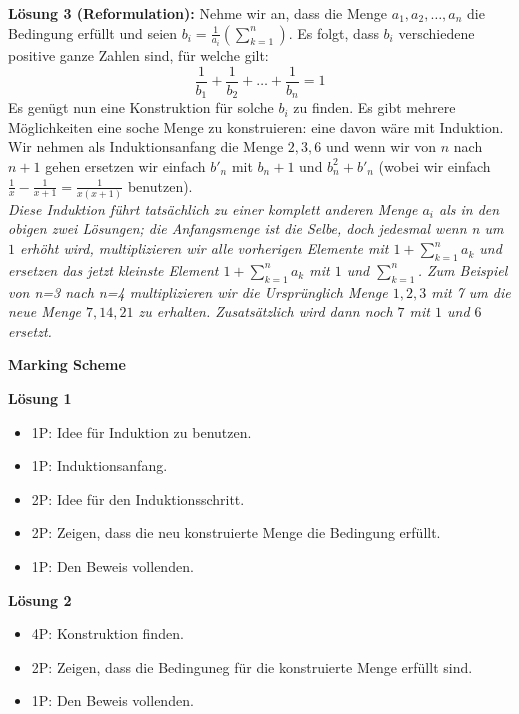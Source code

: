 {\textbf{Lösung 3 (Reformulation):} Nehme wir an, dass die Menge $a_1, a_2, \dots, a_n$ die Bedingung erfüllt und seien $b_i = \frac{1}{a_i}\left(\sum_{k=1}^n\right)$. Es folgt, dass $b_i$ verschiedene positive ganze Zahlen sind, für welche gilt:
\[
\frac{1}{b_1}+\frac{1}{b_2}+\dots+\frac{1}{b_n} = 1
\]
Es genügt nun  eine Konstruktion für solche $b_i$ zu finden. Es gibt mehrere Möglichkeiten eine soche Menge  zu konstruieren: eine davon wäre mit Induktion.\\
Wir nehmen als Induktionsanfang die Menge ${2,3,6}$ und wenn wir von $n$ nach $n+1$ gehen ersetzen wir einfach $b'_n$ mit $b_n+1$ und $b_n^2+b'_n$ (wobei wir einfach $\frac{1}{x}-\frac{1}{x+1} = \frac{1}{x(x+1)}$ benutzen). \\
\emph{Diese Induktion führt tatsächlich zu einer komplett anderen Menge $a_i$  als in den obigen zwei Lösungen; die Anfangsmenge ist die Selbe, doch jedesmal wenn n um $1$ erhöht wird, multiplizieren wir alle vorherigen Elemente mit  $1+ \sum_{k=1}^{n} a_k$ und ersetzen das jetzt kleinste Element $1+ \sum_{k=1}^{n} a_k$ mit $1$ und  $\sum_{k=1}^n$. Zum Beispiel von n=3 nach n=4  multiplizieren wir die Ursprünglich Menge ${1,2,3}$ mit 7 um die neue Menge ${7,14,21}$ zu erhalten. Zusatsätzlich wird dann noch $7$ mit $1$ und $6$ ersetzt.}


\textbf{Marking Scheme}

\textbf{Lösung 1}
\begin{itemize}
\item 1P: Idee für Induktion zu benutzen.
\item 1P: Induktionsanfang.
\item 2P: Idee für den Induktionsschritt.
\item 2P: Zeigen, dass die neu konstruierte Menge die Bedingung erfüllt.
\item 1P: Den Beweis vollenden.
\end{itemize}
\textbf{Lösung 2}
\begin{itemize}
\item 4P: Konstruktion finden.
\item 2P: Zeigen, dass die Bedinguneg für die konstruierte Menge erfüllt sind.
\item 1P: Den Beweis vollenden.
\end{itemize}
}


